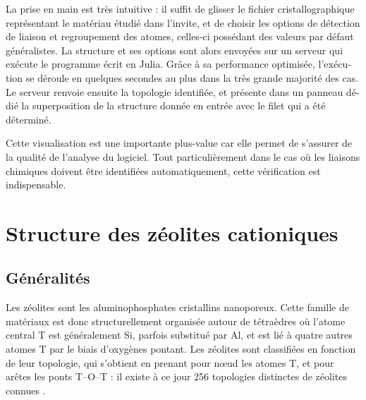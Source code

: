 \documentclass[thesis]{subfiles}
\begin{document}
\begin{otherlanguage}{french}
La prise en main est très intuitive : il suffit de glisser le fichier cristallographique représentant le matériau étudié dans l'invite, et de choisir les options de détection de liaison et regroupement des atomes, celles-ci possédant des valeurs par défaut généralistes. La structure et ses options sont alors envoyées sur un serveur qui exécute le programme écrit en Julia. Grâce à sa performance optimisée, l'exécution se déroule en quelques secondes au plus dans la très grande majorité des cas. Le serveur renvoie ensuite la topologie identifiée, et présente dans un panneau dédié la superposition de la structure donnée en entrée avec le filet qui a été déterminé.

Cette visualisation est une importante plus-value car elle permet de s'assurer de la qualité de l'analyse du logiciel. Tout particulièrement dans le cas où les liaisons chimiques doivent être identifiées automatiquement, cette vérification est indispensable.


\section{Structure des zéolites cationiques}

\subsection{Généralités}

Les zéolites sont les aluminophosphates cristallins nanoporeux. Cette famille de matériaux est donc structurellement organisée autour de tétraèdres  où l'atome central T est généralement Si, parfois substitué par Al, et est lié à quatre autres atomes T par le biais d'oxygènes pontant. Les zéolites sont classifiées en fonction de leur topologie, qui s'obtient en prenant pour n\oe ud les atomes T, et pour arêtes les ponts T--O--T : il existe à ce jour 256 topologies distinctes de zéolites connues \autocite{IZA}.


\end{otherlanguage}
\end{document}
